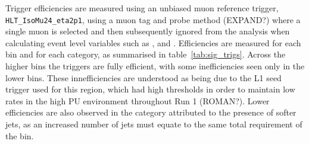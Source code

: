 Trigger efficiencies are measured using an unbiased muon reference trigger,
\\\verb!HLT_IsoMu24_eta2p1!, using a muon tag and probe method (EXPAND?) where a
single muon is selected and then subsequently ignored from the analysis when 
calculating event level variables such as \HT, \mht and \alphat. Efficiencies 
are measured for each \HT bin and for each \nj category, as summarised in 
table~\ref{tab:sig_trigs}. Across the higher \HT 
bins the triggers are fully efficient, with some inefficiencies seen only in the
lower \HT bins. These innefficiencies are understood as being due to the L1 seed
trigger used for this region, which had high thresholds in order to maintain 
low rates in the high PU environment throughout Run 1 (ROMAN?). Lower 
efficiencies are also observed in the \njhigh category attributed to the presence of 
softer jets, as an increased number of jets must equate to the same total \HT 
requirement of the bin.

